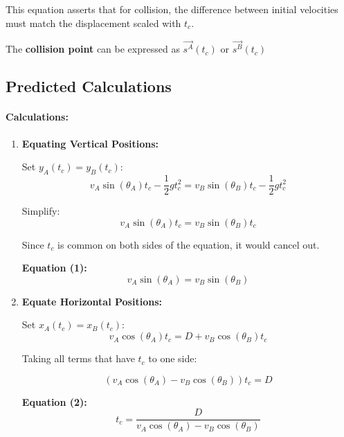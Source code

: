 \documentclass[12pt]{article}
\begin{document}
This equation asserts that for collision, the difference between initial velocities must match the displacement scaled with $t_c$. 

The \textbf{collision point} can be expressed as \(\vec{s^A}(t_c)\) or \(\vec{s^B}(t_c)\)































\subsection{Predicted Calculations}

\paragraph{Calculations:}
\begin{enumerate}
    \item \textbf{Equating Vertical Positions:} 
    
    Set \( y_A(t_c) = y_B(t_c) \):
    \[
    v_A \sin(\theta_A) t_c - \frac{1}{2} g t_c^2 = v_B \sin(\theta_B) t_c - \frac{1}{2} g t_c^2
    \]
    
    Simplify:
    \[
    v_A \sin(\theta_A) t_c = v_B \sin(\theta_B) t_c
    \]
    
    Since \( t_c \) is common on both sides of the equation, it would cancel out.
    
    \textbf{Equation (1):}
    \[
    v_A \sin(\theta_A) = v_B \sin(\theta_B)
    \]
    
    \item \textbf{Equate Horizontal Positions:} 
    
    Set \( x_A(t_c) = x_B(t_c) \):
    \[
    v_A \cos(\theta_A) t_c = D + v_B \cos(\theta_B) t_c
    \]
    
    Taking all terms that have \( t_c \) to one side:

    \[
    (v_A \cos(\theta_A) - v_B \cos(\theta_B)) t_c = D
    \]
    
    \textbf{Equation (2):}
    \[
    t_c = \frac{D}{v_A \cos(\theta_A) - v_B \cos(\theta_B)}
    \]
\end{enumerate}
\end{document}
